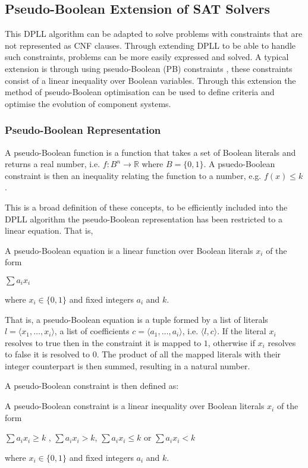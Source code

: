 \subsection{Pseudo-Boolean Extension of SAT Solvers}
This DPLL algorithm can be adapted to solve problems with constraints that are not represented as CNF clauses.
Through extending DPLL to be able to handle such constraints, problems can be more easily expressed and solved.
A typical extension is through using pseudo-Boolean (PB) constraints \citep{dixon2004automating}, these constraints consist of a linear inequality over Boolean variables.
Through this extension the method of pseudo-Boolean optimisation can be used to define criteria and optimise the evolution of component systems.

\subsubsection{Pseudo-Boolean Representation}
A pseudo-Boolean function is a function that takes a set of Boolean literals and returns a real number, i.e. $f:B^n \rightarrow \mathbb{R}$ where $B = \{0,1\}$.
A psuedo-Boolean constraint is then an inequality relating the function to a number, e.g. $f(x) \leq k$.

This is a broad definition of these concepts, to be efficiently included into the DPLL algorithm the pseudo-Boolean representation has been restricted to a linear equation.
That is,
\begin{defs}
A pseudo-Boolean equation is a linear function over Boolean literals $x_i$ of the form

$\sum a_i x_i$

where $x_i \in \{0,1\}$ and fixed integers $a_i$ and $k$.
\end{defs}

That is, a pseudo-Boolean equation is a tuple formed by a list of literals $l = \langle x_1,\ldots,x_i \rangle$, 
a list of coefficients $c = \langle a_1,\ldots,a_i \rangle$, i.e. $\langle l, c \rangle$.
If the literal $x_i$ resolves to true then in the constraint it is mapped to $1$, otherwise  if $x_i$ resolves to false it is resolved to $0$.
The product of all the mapped literals with their integer counterpart is then summed, resulting in a natural number. 

A pseudo-Boolean constraint is then defined as:
\begin{defs}
A pseudo-Boolean constraint is a linear inequality over Boolean literals $x_i$ of the form

$\sum a_i x_i \geq k$ , $\sum a_i x_i > k$, $\sum a_i x_i \leq k$ or $\sum a_i x_i < k$

where $x_i \in \{0,1\}$ and fixed integers $a_i$ and $k$.
\end{defs}

